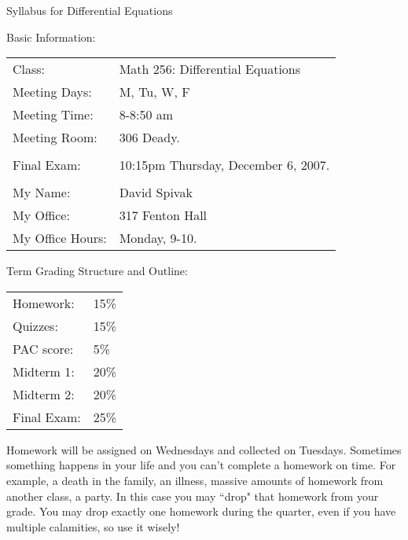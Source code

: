 \documentclass[12pt]{letter}
\begin{document}
\begin{center}\Large Syllabus for Differential 
Equations \normalsize\end{center}

\vspace{.7in}

\Large Basic Information:\normalsize\\

\vspace{.1in}

\begin{tabular}{ll}

Class:& Math 256: Differential Equations\\
Meeting Days:& M, Tu, W, F\\
Meeting Time:& 8-8:50 am\\
Meeting Room:& 306 Deady.\\
&\\
Final Exam:& 10:15pm Thursday, December 6, 2007.\\
&\\
My Name:&David Spivak\\
My Office:&317 Fenton Hall\\
My Office Hours:& Monday, 9-10.\\

\end{tabular}

\vspace{.2in}

\Large Term Grading Structure and Outline:\normalsize\\

\vspace{.1in}

\begin{tabular}{ll}

Homework:&15\%\\
Quizzes:&15\%\\
PAC score:&5\%\\
Midterm 1:&20\%\\
Midterm 2:&20\%\\
Final Exam:&25\%\\

\end{tabular}

\vspace{.1in}

Homework will be assigned on Wednesdays and collected on Tuesdays.  
Sometimes something happens in your life and you can't complete a homework 
on time.  For example, a death in the family, an illness, massive amounts 
of homework from another class, a party.  In this case you may ``drop" 
that homework from your grade.  You may drop exactly one homework during 
the quarter, even if you have multiple calamities, so use it wisely!
\end{document}
